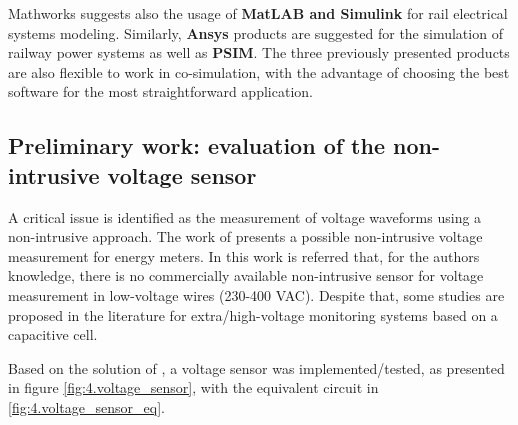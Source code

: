 Mathworks suggests also the usage of \textbf{MatLAB and Simulink} for rail electrical systems modeling. 
Similarly, \textbf{Ansys} products are suggested for the simulation of railway power systems as well as \textbf{PSIM}. The three previously presented products are also flexible to work in co-simulation, with the advantage of choosing the best software for the most straightforward application.

\subsection{Preliminary work: evaluation of the non-intrusive voltage sensor}

	A critical issue is identified as the measurement of voltage waveforms using a non-intrusive approach. 
	The work of \cite{brunelli2016} presents a possible non-intrusive voltage measurement for energy meters.
	In this work is referred that, for the authors knowledge, there is no commercially available non-intrusive sensor for voltage measurement in low-voltage wires (230-400 VAC). 
	Despite that, some studies are proposed in the literature for extra/high-voltage monitoring systems based on a capacitive cell.
	
	Based on the solution of \cite{brunelli2016}, a voltage sensor was implemented/tested, as presented in figure \ref{fig:4.voltage_sensor}, with the equivalent circuit in \ref{fig:4.voltage_sensor_eq}. 
	
	
	
